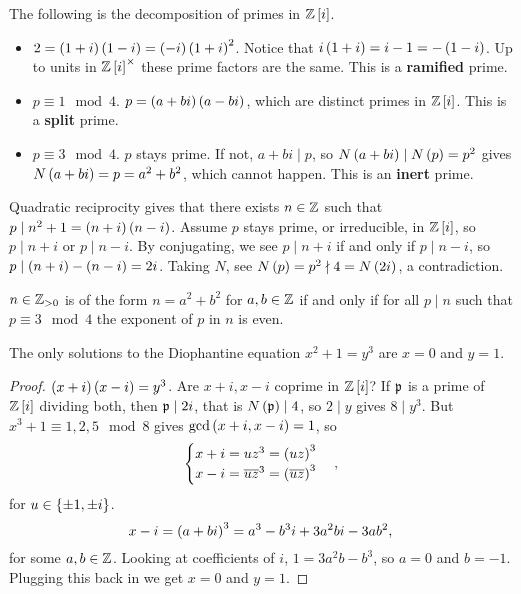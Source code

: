 The following is the decomposition of primes in $ \mathbb{Z}\left[ i \right] $.
\begin{itemize}
\item $ 2 = \left( 1 + i \right)\left( 1 - i \right) = \left( -i \right)\left( 1 + i \right)^2 $. Notice that $ i\left( 1 + i \right) = i - 1 = -\left( 1 - i \right) $. Up to units in $ \mathbb{Z}\left[ i \right]^\times $ these prime factors are the same. This is a \textbf{ramified} prime.
\item $ p \equiv 1 \mod 4 $. $ p = \left( a + bi \right)\left( a - bi \right) $, which are distinct primes in $ \mathbb{Z}\left[ i \right] $. This is a \textbf{split} prime.
\item $ p \equiv 3 \mod 4 $. $ p $ stays prime. If not, $ a + bi \mid p $, so $ N\left( a + bi \right) \mid N\left( p \right) = p^2 $ gives $ N\left( a + bi \right) = p = a^2 + b^2 $, which cannot happen. This is an \textbf{inert} prime.
\end{itemize}


Quadratic reciprocity gives that there exists $ n \in \mathbb{Z} $ such that $ p \mid n^2 + 1 = \left( n + i \right)\left( n - i \right) $. Assume $ p $ stays prime, or irreducible, in $ \mathbb{Z}\left[ i \right] $, so $ p \mid n + i $ or $ p \mid n - i $. By conjugating, we see $ p \mid n + i $ if and only if $ p \mid n - i $, so $ p \mid \left( n + i \right) - \left( n - i \right) = 2i $. Taking $ N $, see $ N\left( p \right) = p^2 \nmid 4 = N\left( 2i \right) $, a contradiction.

\begin{theorem}
$ n \in \mathbb{Z}_{> 0} $ is of the form $ n = a^2 + b^2 $ for $ a, b \in \mathbb{Z} $ if and only if for all $ p \mid n $ such that $ p \equiv 3 \mod 4 $ the exponent of $ p $ in $ n $ is even.
\end{theorem}

\begin{theorem}
The only solutions to the Diophantine equation $ x^2 + 1 = y^3 $ are $ x = 0 $ and $ y = 1 $.
\end{theorem}

\begin{proof}
$ \left( x + i \right)\left( x - i \right) = y^3 $. Are $ x + i, x - i $ coprime in $ \mathbb{Z}\left[ i \right] $? If $ \mathfrak{p} $ is a prime of $ \mathbb{Z}\left[ i \right] $ dividing both, then $ \mathfrak{p} \mid 2i $, that is $ N\left( \mathfrak{p} \right) \mid 4 $, so $ 2 \mid y $ gives $ 8 \mid y^3 $. But $ x^3 + 1 \equiv 1, 2, 5 \mod 8 $ gives $ \gcd\left( x + i, x - i \right) = 1 $, so
$$
\begin{cases}
x + i = uz^3 = \left( uz \right)^3 \\
x - i = \overline{u}\overline{z}^3 = \left( \overline{u}\overline{z} \right)^3
\end{cases},
$$
for $ u \in \left\{ \pm 1, \pm i \right\} $.
$$ x - i = \left( a + bi \right)^3 = a^3 - b^3i + 3a^2bi - 3ab^2, $$
for some $ a, b \in \mathbb{Z} $. Looking at coefficients of $ i $, $ 1 = 3a^2b - b^3 $, so $ a = 0 $ and $ b = -1 $. Plugging this back in we get $ x = 0 $ and $ y = 1 $.
\end{proof}

